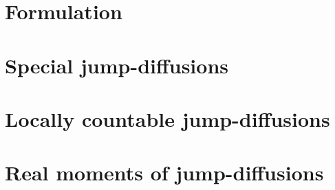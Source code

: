 

\section{Formulation}
\label{jump-diffusions:formulation}


\section{Special jump-diffusions}
\label{jump-diffusions:special}


\section{Locally countable jump-diffusions}
\label{jump-diffusions:countable}


\section{Real moments of jump-diffusions}
\label{jump-diffusions:real-moments}

